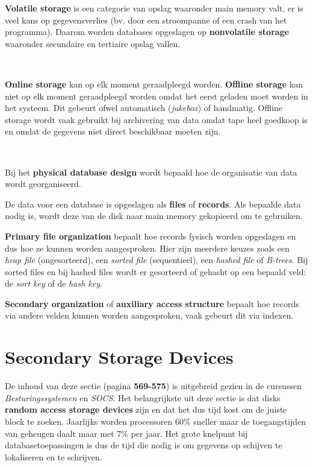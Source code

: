 \textbf{Volatile storage} is een categorie van opslag waaronder main memory valt, er is veel kans op gegevensverlies (bv. door een stroompanne of een crash van het programma). Daarom worden databases opgeslagen op \textbf{nonvolatile storage} waaronder secundaire en tertiaire opslag vallen.

~

\noindent \textbf{Online storage} kan op elk moment geraadpleegd worden. \textbf{Offline storage} kan niet op elk moment geraadpleegd worden omdat het eerst geladen moet worden in het systeem. Dit gebeurt ofwel automatisch (\textit{jukebox}) of handmatig. Offline storage wordt vaak gebruikt bij archivering van data omdat tape heel goedkoop is en omdat de gegevens niet direct beschikbaar moeten zijn.

~

\noindent Bij het \textbf{physical database design} wordt bepaald hoe de organisatie van data wordt georganiseerd.

De data voor een database is opgeslagen als \textbf{files} of \textbf{records}. Als bepaalde data nodig is, wordt deze van de disk naar main memory gekopieerd om te gebruiken.

\textbf{Primary file organization} bepaalt hoe records fysisch worden opgeslagen en dus hoe ze kunnen worden aangesproken. Hier zijn meerdere keuzes zoals een \textit{heap file} (ongesorteerd), een \textit{sorted file} (sequentieel), een \textit{hashed file} of \textit{B-trees}. Bij sorted files en bij hashed files wordt er gesorteerd of gehasht op een bepaald veld: de \textit{sort key} of de \textit{hash key}.

\textbf{Secondary organization} of \textbf{auxiliary access structure} bepaalt hoe records via andere velden kunnen worden aangesproken, vaak gebeurt dit via indexen.



\section{Secondary Storage Devices}
De inhoud van deze sectie (pagina \textbf{569-575}) is uitgebreid gezien in de cursussen \textit{Besturingssystemen} en \textit{SOCS}. Het belangrijkste uit deze sectie is dat disks \textbf{random access storage devices} zijn en dat het dus tijd kost om de juiste block te zoeken. Jaarlijks worden processoren 60\% sneller maar de toegangstijden van geheugen daalt maar met 7\% per jaar. Het grote knelpunt bij databasetoepassingen is dus de tijd die nodig is om gegevens op schijven te lokaliseren en te schrijven.


